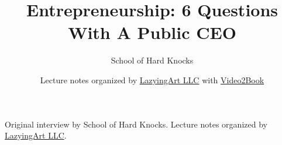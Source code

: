 \documentclass[11pt,oneside]{book}
\begin{document}
\frontmatter
\title{Entrepreneurship: 6 Questions With A Public CEO}
\author{School of Hard Knocks}
\date{Lecture notes organized by \href{https://lazying.art}{LazyingArt LLC} with \href{https://github.com/lachlanchen/Video2Book}{Video2Book}}
\maketitle
\begin{center}
\small Original interview by School of Hard Knocks. Lecture notes organized by \href{https://lazying.art}{LazyingArt LLC}.
\end{center}
\clearpage
\mainmatter

\end{document}
